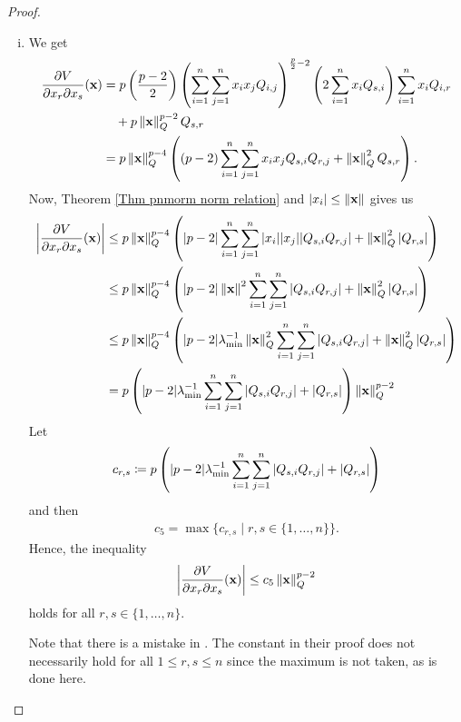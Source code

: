 \documentclass[a4paper,12pt,twoside,BCOR=10mm]{scrbook}
\begin{document}
\begin{proof}
\begin{enumerate}[i)]
    \item We get
    \begin{align*}
        \frac{\partial V}{\partial x_r \partial x_s}(\mathbf{x}) &= p\left(\frac{p - 2}{2}\right)\left (\sum_{i = 1}^n\sum_{j = 1}^n x_ix_j Q_{i,j} \right)^{\frac{p}{2} - 2} \left(2 \sum_{i = 1}^n x_i Q_{s,i}\right)\sum_{i = 1}^n x_i Q_{i,r}\\
        &\quad + p\left\lVert\mathbf{x}\right\rVert_{Q}^{p-2}Q_{s,r}\\
        &= p\left\lVert\mathbf{x}\right\rVert_{Q}^{p-4}\left( (p-2)\sum\limits_{i = 1}^n\sum\limits_{j = 1}^n x_i x_j Q_{s,i}Q_{r,j} + \left\lVert\mathbf{x}\right\rVert_{Q}^{2}Q_{s,r}\right).
    \end{align*}
    Now, Theorem \ref{Thm pnmorm norm relation} and $|x_i| \leq \left\lVert\mathbf{x}\right\rVert$ gives us
    \begin{align*}
        \left | \frac{\partial V}{\partial x_r \partial x_s}(\mathbf{x}) \right | &\leq p\left\lVert\mathbf{x}\right\rVert_{Q}^{p-4}\left(|p-2| \sum\limits_{i = 1}^n\sum\limits_{j = 1}^n |x_i||x_j||Q_{s,i}Q_{r,j}| + \left\lVert\mathbf{x}\right\rVert_{Q}^{2}|Q_{r,s}|\right)\\
        &\leq p\left\lVert\mathbf{x}\right\rVert_{Q}^{p-4}\left(|p-2| \left\lVert\mathbf{x}\right\rVert^2 \sum\limits_{i = 1}^n\sum\limits_{j = 1}^n|Q_{s,i}Q_{r,j}| + \left\lVert\mathbf{x}\right\rVert_{Q}^{2}|Q_{r,s}| \right)\\
        &\leq p\left\lVert\mathbf{x}\right\rVert_{Q}^{p-4}\left(|p-2| \lambda_{\min}^{-1}\left\lVert\mathbf{x}\right\rVert_{Q}^{2} \sum\limits_{i = 1}^n\sum\limits_{j = 1}^n|Q_{s,i}Q_{r,j}| + \left\lVert\mathbf{x}\right\rVert_{Q}^{2}|Q_{r,s}| \right)\\
        &= p\left(|p-2|\lambda_{\min}^{-1} \sum\limits_{i = 1}^n\sum\limits_{j = 1}^n|Q_{s,i}Q_{r,j}| + |Q_{r,s}| \right)\left\lVert\mathbf{x}\right\rVert_{Q}^{p-2}
    \end{align*}
    Let
    \begin{align*}
        c_{r,s} \coloneqq p\left(|p-2|\lambda_{\min}^{-1} \sum\limits_{i = 1}^n\sum\limits_{j = 1}^n|Q_{s,i}Q_{r,j}| + |Q_{r,s}| \right)
    \end{align*}
    and then
    \begin{align*}
        c_5 = \max\{c_{r,s} \mid r,s\in\{1,\ldots, n\}\}.
    \end{align*}
    Hence, the inequality
    \begin{align*}
        \left| \frac{\partial V}{\partial x_r\partial x_s}(\mathbf{x})\right| \leq c_5 \left\lVert\mathbf{x}\right\rVert_{Q}^{p-2}
    \end{align*}
    holds for all $r,s \in \{1,\ldots, n\}$.
    
    Note that there is a mistake in \citep{Ha2019BMI}. The constant in their proof does not necessarily hold for all $1\leq r,s \leq n$ since the maximum is not taken, as is done here.
\end{enumerate}
\end{proof}
\end{document}
